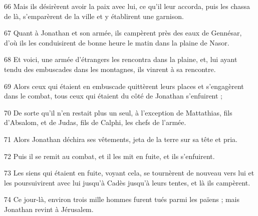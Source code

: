 \par 66 Mais ils désirèrent avoir la paix avec lui, ce qu'il leur accorda, puis les chassa de là, s'emparèrent de la ville et y établirent une garnison.
\par 67 Quant à Jonathan et son armée, ils campèrent près des eaux de Gennésar, d'où ils les conduisirent de bonne heure le matin dans la plaine de Nasor.
\par 68 Et voici, une armée d'étrangers les rencontra dans la plaine, et, lui ayant tendu des embuscades dans les montagnes, ils vinrent à sa rencontre.
\par 69 Alors ceux qui étaient en embuscade quittèrent leurs places et s'engagèrent dans le combat, tous ceux qui étaient du côté de Jonathan s'enfuirent ;
\par 70 De sorte qu'il n'en restait plus un seul, à l'exception de Mattathias, fils d'Absalom, et de Judas, fils de Calphi, les chefs de l'armée.
\par 71 Alors Jonathan déchira ses vêtements, jeta de la terre sur sa tête et pria.
\par 72 Puis il se remit au combat, et il les mit en fuite, et ils s'enfuirent.
\par 73 Les siens qui étaient en fuite, voyant cela, se tournèrent de nouveau vers lui et les poursuivirent avec lui jusqu'à Cadès jusqu'à leurs tentes, et là ils campèrent.
\par 74 Ce jour-là, environ trois mille hommes furent tués parmi les païens ; mais Jonathan revint à Jérusalem.


